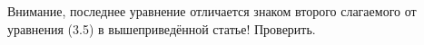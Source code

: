 \documentclass{article}
\begin{document}
{\color{red}Внимание, последнее уравнение отличается знаком второго слагаемого от уравнения (3.5) в вышеприведённой статье! Проверить.}

%
\end{document}
